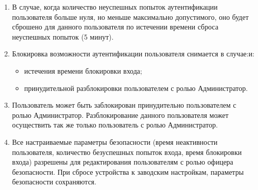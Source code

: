 \begin{enumerate}
\begin{itemize}
\end{itemize}
\item
В случае, когда количество неуспешных попыток аутентификации пользователя больше нуля, но меньше максимально допустимого, оно будет сброшено для данного пользователя по истечении времени сброса неуспешных попыток (5 минут).
\item
Блокировка возможности аутентификации пользователя снимается в случае:и:
\begin{itemize}
    \item истечения времени блокировки входа;
    \item принудительной разблокировки пользователем с ролью Администратор. 
\end{itemize}

\item
Пользователь может быть заблокирован принудительно пользователем с ролью Администратор. Разблокирование данного пользователя может осуществить так же только пользователь с ролью Администратор.
\item
Все настраиваемые параметры безопасности (время неактивности пользователя, количество безуспешных попыток входа, время блокировки входа) разрешены для редактирования пользователям с ролью офицера безопасности. При сбросе устройства к заводским настройкам, параметры безопасности сохраняются.




\end{enumerate}
